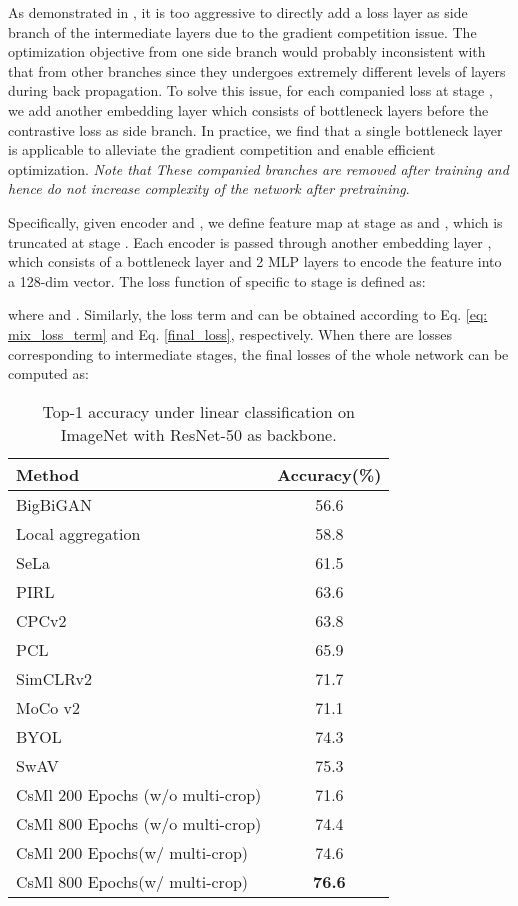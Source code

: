\documentclass[10pt,twocolumn,letterpaper]{article}
\begin{document}
As demonstrated in \cite{romero2014fitnets}, it is too aggressive to directly add a loss layer as side branch of the intermediate layers due to the gradient competition issue. The optimization objective from one side branch would probably inconsistent with that from other branches since they undergoes extremely different levels of layers during back propagation. To solve this issue, for each companied loss at stage , we add another embedding layer  which consists of bottleneck layers before the contrastive loss as side branch. In practice, we find that a single bottleneck layer is applicable to alleviate the gradient competition and enable efficient optimization. \emph{Note that These companied branches are removed after training and hence do not increase complexity of the network after pretraining}.

Specifically, given encoder  and , we define feature map at stage  as  and , which is truncated at stage . Each encoder is passed through another embedding layer , which consists of a bottleneck layer and 2 MLP layers to encode the feature into a 128-dim vector. The loss function of  specific to stage  is defined as:


where  and . Similarly,  the loss term  and  can be obtained according to Eq. \ref{eq: mix_loss_term} and Eq. \ref{final_loss}, respectively. When there are  losses corresponding to  intermediate stages, the final losses of the whole network can be computed as:



\begin{table}[]
\caption{Top-1 accuracy under linear classification on ImageNet with ResNet-50 as backbone.}
\vspace{0.05in}
\fontsize{10}{12}\selectfont
\centering
\setlength{\tabcolsep}{3mm}
\begin{tabular}{lc}
\toprule
Method     & Accuracy(\%) \\
\midrule
BigBiGAN\cite{donahue2019large} &56.6 \\
Local aggregation \cite{zhuang2019local} &58.8 \\
SeLa \cite{asano2020self} &61.5 \\
PIRL \cite{misra2020self} &63.6 \\
CPCv2 \cite{henaff2019data} &63.8 \\
PCL \cite{li2020prototypical} &65.9 \\
SimCLRv2 \cite{chen2020big} &71.7 \\
MoCo v2 \cite{chen2020improved} &71.1 \\
BYOL \cite{grill2020bootstrap} &74.3 \\
SwAV \cite{caron2020unsupervised} &75.3 \\
\midrule
CsMl 200 Epochs (w/o multi-crop) & 71.6 \\
CsMl 800 Epochs (w/o multi-crop) &74.4 \\
\midrule
CsMl 200 Epochs(w/ multi-crop) & 74.6 \\
CsMl 800 Epochs(w/ multi-crop) & \textbf{76.6} \\
\bottomrule
\end{tabular}
\label{tab:lincls_imagenet1K}
\end{table}
\end{document}
